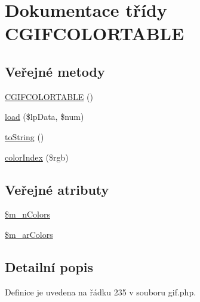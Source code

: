 \hypertarget{class_c_g_i_f_c_o_l_o_r_t_a_b_l_e}{\section{Dokumentace třídy C\-G\-I\-F\-C\-O\-L\-O\-R\-T\-A\-B\-L\-E}
\label{class_c_g_i_f_c_o_l_o_r_t_a_b_l_e}
}
\subsection*{Veřejné metody}
\begin{DoxyCompactItemize}
\item 
\hyperlink{class_c_g_i_f_c_o_l_o_r_t_a_b_l_e_a3c662544783de974fb2d8f5120baa7be}{C\-G\-I\-F\-C\-O\-L\-O\-R\-T\-A\-B\-L\-E} ()
\item 
\hyperlink{class_c_g_i_f_c_o_l_o_r_t_a_b_l_e_a5968ae784da9caa3b3feebcd1def5211}{load} (\$lp\-Data, \$num)
\item 
\hyperlink{class_c_g_i_f_c_o_l_o_r_t_a_b_l_e_a58699340b4a07240725d4f73690b3425}{to\-String} ()
\item 
\hyperlink{class_c_g_i_f_c_o_l_o_r_t_a_b_l_e_ab57c7e17271bcf52a98ebdb16967533b}{color\-Index} (\$rgb)
\end{DoxyCompactItemize}
\subsection*{Veřejné atributy}
\begin{DoxyCompactItemize}
\item 
\hyperlink{class_c_g_i_f_c_o_l_o_r_t_a_b_l_e_a3a69bb2cccfc4d98089ac109f36e40da}{\$m\-\_\-n\-Colors}
\item 
\hyperlink{class_c_g_i_f_c_o_l_o_r_t_a_b_l_e_ae7c3b50beb8acd180571c1d1e68cfd77}{\$m\-\_\-ar\-Colors}
\end{DoxyCompactItemize}


\subsection{Detailní popis}


Definice je uvedena na řádku 235 v souboru gif.\-php.



